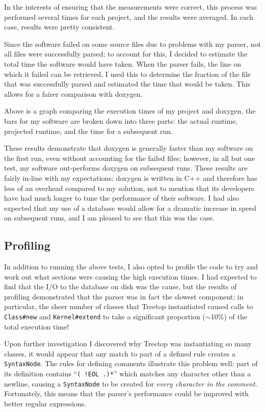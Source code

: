 In the interests of ensuring that the measurements were correct, this process
was performed several times for each project, and the results were averaged. In
each case, results were pretty consistent.

Since the software failed on some source files due to problems with my parser,
not all files were successfully parsed; to account for this, I decided to
estimate the total time the software would have taken. When the parser fails,
the line on which it failed can be retrieved, I used this to determine the
fraction of the file that was successfully parsed and estimated the time that
would be taken. This allows for a fairer comparison with doxygen.

\noindent{}

Above is a graph comparing the execution times of my project and doxygen, the
bars for my software are broken down into three parts: the actual runtime,
projected runtime, and the time for a subsequent run.

These results demonstrate that doxygen is generally faster than my software on
the first run, even without accounting for the failed files; however, in all but
one test, my software out-performs doxygen on subsequent runs. These results are
fairly in-line with my expectations: doxygen is written in C++ and therefore has
less of an overhead compared to my solution, not to mention that its developers
have had much longer to tune the performance of their software. I had also
expected that my use of a database would allow for a dramatic increase in speed
on subsequent runs, and I am pleased to see that this was the case.

  \subsection{Profiling}
  In addition to running the above tests, I also opted to profile the code to
  try and work out what sections were causing the high execution times. I had
  expected to find that the I/O to the database on disk was the cause, but
  the results of profiling demonstrated that the parser was in fact the slowest
  component; in particular, the sheer number of classes that Treetop
  instantiated caused calls to \lstinline|Class#new| and
  \lstinline|Kernel#extend| to take a significant proportion ($\sim$10\%) of the
  total execution time!

  Upon further investigation I discovered why Treetop was instantiating so
  many classes, it would appear that any match to part of a defined rule
  creates a \lstinline|SyntaxNode|. The rules for defining comments illustrate
  this problem well: part of its definition contains ``\lstinline|( !EOL .)*|''
  which matches any character other than a newline, causing a
  \lstinline|SyntaxNode| to be created for \emph{every character in the
  comment}. Fortunately, this means that the parser's performance could be
  improved with better regular expressions.

